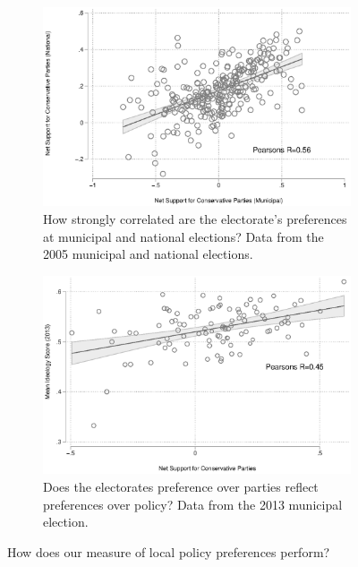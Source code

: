 \documentclass[a4paper,12pt]{article}
\begin{document}
\begin{figure}[htbp]
		\begin{subfigure}{0.45\textwidth}
		\includegraphics[width=1\textwidth]{validation2.eps}
		\caption{How strongly correlated are the electorate's preferences at municipal and national elections? Data from the 2005 municipal and national elections.} \label{validation2}
	\end{subfigure}
	\begin{subfigure}{0.45\textwidth}
		\includegraphics[width=1\textwidth]{validation.eps}
		\caption{Does the electorates preference over parties reflect preferences over policy? Data from the 2013 municipal election.} \label{validation1}
	\end{subfigure}  \hfill
	\caption{How does our measure of local policy preferences perform?}
\end{figure}
\end{document}
